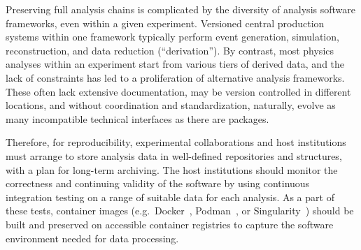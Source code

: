 \documentclass[11pt]{article}
\begin{document}
Preserving full analysis chains is complicated by the diversity of analysis software frameworks, even within a given experiment.
Versioned central production systems within one framework typically perform event generation, simulation, reconstruction, and data reduction (``derivation'').
By contrast, most physics analyses within an experiment start from various tiers of derived data, and the lack of constraints has led to a proliferation of alternative analysis frameworks.
These often lack extensive documentation, may be version controlled in different locations, and without coordination and standardization, naturally, evolve as many incompatible technical interfaces as there are packages.

Therefore, for reproducibility, experimental collaborations and host institutions must arrange to store analysis data in well-defined repositories and structures, with a plan for long-term archiving.
The host institutions should monitor the correctness and continuing validity of the software by using continuous integration testing on a range of suitable \gls{data} for each analysis.
As a part of these tests, container images (e.g.~Docker~\cite{docker}, Podman~\cite{podman}, or Singularity~\cite{singularity}) should be built and preserved on accessible container registries to capture the software environment needed for data processing.


\end{document}
